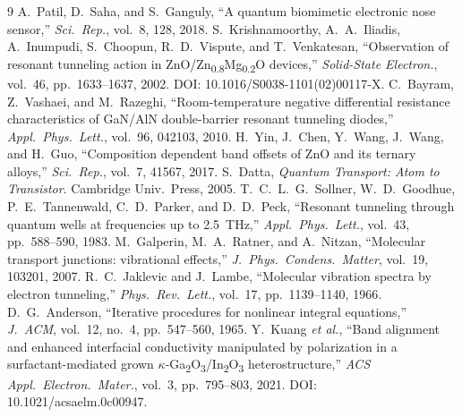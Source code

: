 \documentclass[conference]{IEEEtran}
\begin{document}
\begin{thebibliography}{9}
 A.~Patil, D.~Saha, and S.~Ganguly, ``A quantum
biomimetic electronic nose sensor,'' \textit{Sci.\ Rep.}, vol.~8, 128,
2018.
 S.~Krishnamoorthy, A.~A.~Iliadis, A.~Inumpudi,
S.~Choopun, R.~D.~Vispute, and T.~Venkatesan,
``Observation of resonant tunneling action in
ZnO/Zn\textsubscript{0.8}Mg\textsubscript{0.2}O devices,''
\textit{Solid-State Electron.}, vol.~46, pp.~1633--1637, 2002.
DOI: 10.1016/S0038-1101(02)00117-X.
 C.~Bayram, Z.~Vashaei, and M.~Razeghi,
``Room-temperature negative differential resistance characteristics of
GaN/AlN double-barrier resonant tunneling diodes,''
\textit{Appl.\ Phys.\ Lett.}, vol.~96, 042103, 2010.
 H.~Yin, J.~Chen, Y.~Wang, J.~Wang, and H.~Guo,
``Composition dependent band offsets of ZnO and its ternary alloys,''
\textit{Sci.\ Rep.}, vol.~7, 41567, 2017.
 S.~Datta, \textit{Quantum Transport: Atom to Transistor}.
Cambridge Univ.\ Press, 2005.
 T.~C.~L.~G.~Sollner, W.~D.~Goodhue, P.~E.~Tannenwald,
C.~D.~Parker, and D.~D.~Peck, ``Resonant tunneling through quantum wells
at frequencies up to 2.5~THz,'' \textit{Appl.\ Phys.\ Lett.}, vol.~43,
pp.~588--590, 1983.
 M.~Galperin, M.~A.~Ratner, and A.~Nitzan,
``Molecular transport junctions: vibrational effects,''
\textit{J.\ Phys.\ Condens.\ Matter}, vol.~19, 103201, 2007.
 R.~C.~Jaklevic and J.~Lambe, ``Molecular vibration
spectra by electron tunneling,'' \textit{Phys.\ Rev.\ Lett.}, vol.~17,
pp.~1139--1140, 1966.
 D.~G.~Anderson, ``Iterative procedures for
nonlinear integral equations,'' \textit{J.\ ACM}, vol.~12, no.~4,
pp.~547--560, 1965.
 Y.~Kuang \textit{et al.},
``Band alignment and enhanced interfacial conductivity manipulated by
polarization in a surfactant-mediated grown
$\kappa$-Ga\textsubscript{2}O\textsubscript{3}/In\textsubscript{2}O\textsubscript{3}
heterostructure,'' \textit{ACS Appl.\ Electron.\ Mater.}, vol.~3,
pp.~795--803, 2021. DOI: 10.1021/acsaelm.0c00947.
\end{thebibliography}

\clearpage
\end{document}
